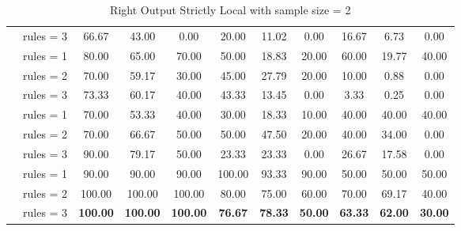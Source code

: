 \begin{table*}[t]
{\begin{tabular}{l c ccc ccc ccc}
           & \cellcolor{SeaGreen3!50}rules = 3 & \cellcolor{SeaGreen3!50}66.67 & \cellcolor{SeaGreen3!50}43.00 & \cellcolor{SeaGreen3!50}0.00 & \cellcolor{SeaGreen3!50}20.00 & \cellcolor{SeaGreen3!50}11.02 & \cellcolor{SeaGreen3!50}0.00 & \cellcolor{SeaGreen3!50}16.67 & \cellcolor{SeaGreen3!50}6.73 & \cellcolor{SeaGreen3!50}0.00\\
           \hdashline
           \multirow{3}{*}{DeepSeek-V3} & rules = 1 & 80.00 & 65.00 & 70.00 & 50.00 & 18.83 & 20.00 & 60.00 & 19.77 & 40.00\\
           & rules = 2 & 70.00 & 59.17 & 30.00 & 45.00 & 27.79 & 20.00 & 10.00 & 0.88 & 0.00\\
           & \cellcolor{SeaGreen3!50}rules = 3 & \cellcolor{SeaGreen3!50}73.33 & \cellcolor{SeaGreen3!50}60.17 & \cellcolor{SeaGreen3!50}40.00 & \cellcolor{SeaGreen3!50}43.33 & \cellcolor{SeaGreen3!50}13.45 & \cellcolor{SeaGreen3!50}0.00 & \cellcolor{SeaGreen3!50}3.33 & \cellcolor{SeaGreen3!50}0.25 & \cellcolor{SeaGreen3!50}0.00\\
           \hdashline
           \multirow{3}{*}{o1-mini} & rules = 1 & 70.00 & 53.33 & 40.00 & 30.00 & 18.33 & 10.00 & 40.00 & 40.00 & 40.00\\
           & rules = 2 & 70.00 & 66.67 & 50.00 & 50.00 & 47.50 & 20.00 & 40.00 & 34.00 & 0.00\\
           & \cellcolor{SeaGreen3!50}rules = 3 & \cellcolor{SeaGreen3!50}90.00 & \cellcolor{SeaGreen3!50}79.17 & \cellcolor{SeaGreen3!50}50.00 & \cellcolor{SeaGreen3!50}23.33 & \cellcolor{SeaGreen3!50}23.33 & \cellcolor{SeaGreen3!50}0.00 & \cellcolor{SeaGreen3!50}26.67 & \cellcolor{SeaGreen3!50}17.58 & \cellcolor{SeaGreen3!50}0.00\\
           \hdashline
           \multirow{3}{*}{o3-mini} & rules = 1 & 90.00 & 90.00 & 90.00 & 100.00 & 93.33 & 90.00 & 50.00 & 50.00 & 50.00\\
           & rules = 2 & 100.00 & 100.00 & 100.00 & 80.00 & 75.00 & 60.00 & 70.00 & 69.17 & 40.00\\
           & \cellcolor{SeaGreen3!50}rules = 3 & \cellcolor{SeaGreen3!50}\textbf{100.00} & \cellcolor{SeaGreen3!50}\textbf{100.00} & \cellcolor{SeaGreen3!50}\textbf{100.00} & \cellcolor{SeaGreen3!50}\textbf{76.67} & \cellcolor{SeaGreen3!50}\textbf{78.33} & \cellcolor{SeaGreen3!50}\textbf{50.00} & \cellcolor{SeaGreen3!50}\textbf{63.33} & \cellcolor{SeaGreen3!50}\textbf{62.00} & \cellcolor{SeaGreen3!50}\textbf{30.00}\\
           \bottomrule
    \end{tabular}
    }
    \caption{Right Output Strictly Local with sample size = 2}
    \label{tab:ROSL_main}
\end{table*}